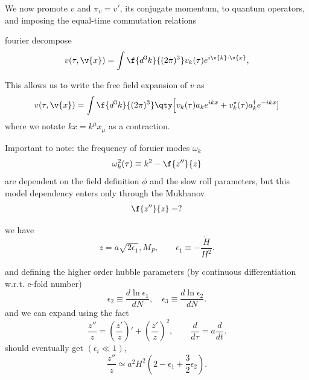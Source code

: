 We now promote $v$ and $\pi_v=v'$, its conjugate momentum, to quantum operators, and imposing the equal-time commutation relations



fourier decompose
\begin{equation}
v(\tau,\v{x}) = \int \f{d^3k}{(2\pi)^3} v_k(\tau) e^{i\v{k}\cdot\v{x}},
\end{equation}

This allows us to write the free field expansion of $v$ as
\begin{equation}
    v(\tau,\v{x})=\int \f{d^3k}{(2\pi)^3}\qty\Big[v_k(\tau)a_ke^{ikx}+v^\star_k(\tau)a^\dagger_ke^{-ikx}]
\end{equation}
where we notate $kx=k^\mu x_\mu$ as a contraction.



Important to note: the frequency of foruier modes $\omega_k$ 
\begin{equation}
    \omega^2_k(\tau)\equiv k^2-\f{z''}{z}
\end{equation}
are dependent on the field definition $\phi$ and the slow roll parameters, but this model dependency enters only through the Mukhanov
\[
\f{z''}{z}=?
\]

we have
$$
z = a\sqrt{2\epsilon_1},M_P,  
\qquad \epsilon_1\equiv -\frac{\dot H}{H^2}.  
$$

and defining the higher order hubble parameters (by continuous differentiation w.r.t. e-fold number)
$$
\epsilon_2\equiv\frac{d\ln\epsilon_1}{dN},\quad  
\epsilon_3\equiv\frac{d\ln\epsilon_2}{dN}.  
$$
and we can expand using the fact
$$
\frac{z''}{z} = \left(\frac{z'}{z}\right)' + \left(\frac{z'}{z}\right)^2,  
\qquad \frac{d}{d\tau}=a\frac{d}{dt}.  
$$
should eventually get
$(\epsilon_i\ll 1)$,  
$$
\boxed{\frac{z''}{z} \simeq a^2H^2\left(2-\epsilon_1+\frac32\epsilon_2\right).}  
$$





